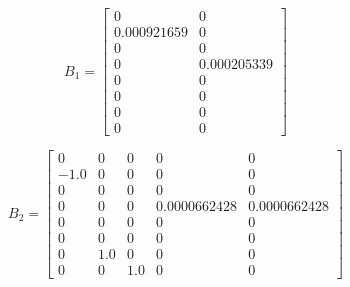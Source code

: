 \documentclass[]{report}
\begin{document}
\hspace{-1cm}
\begin{minipage}{0.45\textwidth}
	\[
	B_1 =
	\begin{bmatrix}
		0 & 0 \\
		0.000921659 & 0 \\
		0 & 0 \\
		0 & 0.000205339 \\
		0 & 0 \\
		0 & 0 \\
		0 & 0 \\
		0 & 0
	\end{bmatrix}
	\]
\end{minipage}
\noindent
\hspace{1cm}
\begin{minipage}{0.45\textwidth}
	\[
	B_2 =
	\begin{bmatrix}
		0 & 0 & 0 & 0 & 0 \\
		-1.0 & 0 & 0 & 0 & 0 \\
		0 & 0 & 0 & 0 & 0 \\
		0 & 0 & 0 & 0.0000662428 & 0.0000662428 \\
		0 & 0 & 0 & 0 & 0 \\
		0 & 0 & 0 & 0 & 0 \\
		0 & 1.0 & 0 & 0 & 0 \\
		0 & 0 & 1.0 & 0 & 0
	\end{bmatrix}
	\]
\end{minipage}
\end{document}
